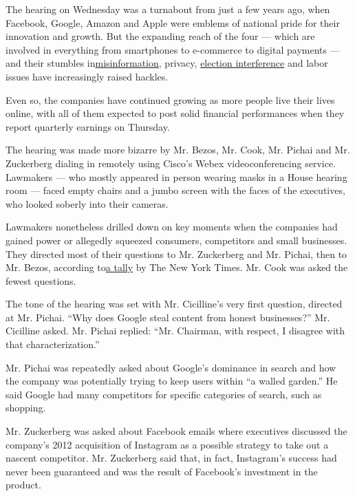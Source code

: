 The hearing on Wednesday was a turnabout from just a few years ago, when
Facebook, Google, Amazon and Apple were emblems of national pride for
their innovation and growth. But the expanding reach of the four ---
which are involved in everything from smartphones to e-commerce to
digital payments --- and their stumbles
in\href{https://www.nytimes3xbfgragh.onion/2020/07/28/technology/virus-video-trump.html}{misinformation},
privacy,
\href{https://www.nytimes3xbfgragh.onion/2018/02/17/technology/indictment-russian-tech-facebook.html}{election
interference} and labor issues have increasingly raised hackles.

Even so, the companies have continued growing as more people live their
lives online, with all of them expected to post solid financial
performances when they report quarterly earnings on Thursday.

The hearing was made more bizarre by Mr. Bezos, Mr. Cook, Mr. Pichai and
Mr. Zuckerberg dialing in remotely using Cisco's Webex videoconferencing
service. Lawmakers --- who mostly appeared in person wearing masks in a
House hearing room --- faced empty chairs and a jumbo screen with the
faces of the executives, who looked soberly into their cameras.

Lawmakers nonetheless drilled down on key moments when the companies had
gained power or allegedly squeezed consumers, competitors and small
businesses. They directed most of their questions to Mr. Zuckerberg and
Mr. Pichai, then to Mr. Bezos, according
to\href{https://www.nytimes3xbfgragh.onion/live/2020/07/29/technology/tech-ceos-hearing-testimony/heres-which-tech-ceo-is-getting-asked-the-most-questions-by-lawmakers}{a
tally} by The New York Times. Mr. Cook was asked the fewest questions.

The tone of the hearing was set with Mr. Cicilline's very first
question, directed at Mr. Pichai. ``Why does Google steal content from
honest businesses?'' Mr. Cicilline asked. Mr. Pichai replied: ``Mr.
Chairman, with respect, I disagree with that characterization.''

Mr. Pichai was repeatedly asked about Google's dominance in search and
how the company was potentially trying to keep users within ``a walled
garden.'' He said Google had many competitors for specific categories of
search, such as shopping.

Mr. Zuckerberg was asked about Facebook emails where executives
discussed the company's 2012 acquisition of Instagram as a possible
strategy to take out a nascent competitor. Mr. Zuckerberg said that, in
fact, Instagram's success had never been guaranteed and was the result
of Facebook's investment in the product.

